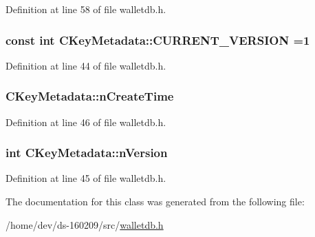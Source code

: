 Definition at line 58 of file walletdb.\+h.

\hypertarget{class_c_key_metadata_a805f9472960eec81031596ce1133e629}{}
\subsubsection[{C\+U\+R\+R\+E\+N\+T\+\_\+\+V\+E\+R\+S\+I\+O\+N}]{\setlength{\rightskip}{0pt plus 5cm}const int C\+Key\+Metadata\+::\+C\+U\+R\+R\+E\+N\+T\+\_\+\+V\+E\+R\+S\+I\+O\+N =1\hspace{0.3cm}{\ttfamily [static]}}\label{class_c_key_metadata_a805f9472960eec81031596ce1133e629}


Definition at line 44 of file walletdb.\+h.

\hypertarget{class_c_key_metadata_accfd31222aefcbdcba1fb0214e546e6d}{}
\subsubsection[{n\+Create\+Time}]{ C\+Key\+Metadata\+::n\+Create\+Time}\label{class_c_key_metadata_accfd31222aefcbdcba1fb0214e546e6d}


Definition at line 46 of file walletdb.\+h.

\hypertarget{class_c_key_metadata_a52f63ceb60b53e491666b6aa59a4d818}{}
\subsubsection[{n\+Version}]{\setlength{\rightskip}{0pt plus 5cm}int C\+Key\+Metadata\+::n\+Version}\label{class_c_key_metadata_a52f63ceb60b53e491666b6aa59a4d818}


Definition at line 45 of file walletdb.\+h.



The documentation for this class was generated from the following file\+:\begin{DoxyCompactItemize}
\item 
/home/dev/ds-\/160209/src/\hyperlink{walletdb_8h}{walletdb.\+h}\end{DoxyCompactItemize}
